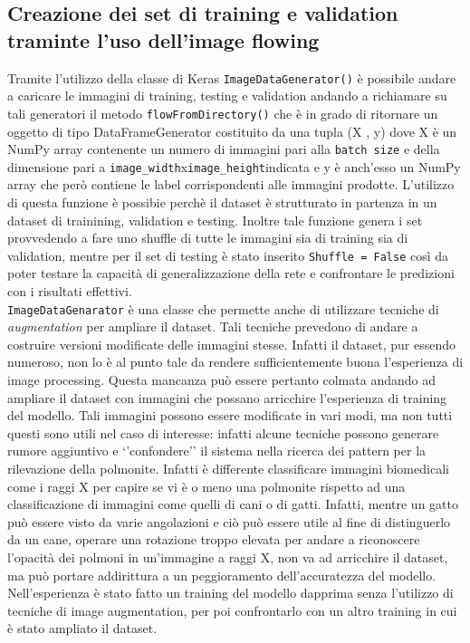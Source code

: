 \subsection{Creazione dei set di training e validation traminte l’uso dell’image flowing}
Tramite l’utilizzo della classe di Keras  \lstinline{ImageDataGenerator()} è possibile andare a caricare le
 immagini di training, testing e validation andando a richiamare su tali generatori il metodo  
 \lstinline{flowFromDirectory()} che è in grado di ritornare un oggetto di tipo DataFrameGenerator
 costituito da una tupla (X , y) dove X è un NumPy array contenente un numero di immagini pari alla 
   \lstinline{batch size} e della dimensione pari a  \lstinline{image_width}x\lstinline{image_height}indicata e 
   y è anch’esso
    un NumPy array che però contiene le label corrispondenti alle immagini prodotte. L’utilizzo di
     questa funzione è possibie perchè il dataset è strutturato in partenza in un dataset di trainining, 
     validation e testing. Inoltre tale funzione genera i set provvedendo a fare uno shuffle di tutte le immagini
      sia di training sia di  validation, mentre per il set di testing è stato inserito  \lstinline{Shuffle = False}
       così da poter testare la capacità di generalizzazione della rete e confrontare le predizioni con i risultati 
       effettivi. \\
 \lstinline{ImageDataGenarator} è una classe che permette anche di utilizzare tecniche di \emph{augmentation}
  per ampliare il dataset. Tali tecniche prevedono di andare a costruire versioni modificate delle immagini stesse. 
  Infatti il dataset, pur essendo numeroso, non lo è al punto tale da rendere sufficientemente buona l’esperienza
   di image processing. Questa mancanza può essere pertanto colmata andando ad ampliare il dataset con immagini
    che possano arricchire l’esperienza di training del modello. Tali immagini possono essere modificate in vari
     modi, ma non tutti questi sono utili nel caso di interesse: infatti alcune tecniche possono generare rumore 
     aggiuntivo e ‘’confondere’’ il sistema nella ricerca dei pattern per la rilevazione della polmonite.
     Infatti è differente classificare immagini biomedicali come i raggi
     X per capire se vi è o meno una polmonite rispetto ad una classificazione di immagini come quelli di 
     cani o di gatti. Infatti, mentre un gatto può essere visto da varie angolazioni e ciò può essere
      utile al fine di distinguerlo da un cane, operare una rotazione troppo elevata per andare a riconoscere 
      l’opacità dei polmoni in un’immagine a raggi X, non va ad arricchire il dataset, ma può portare
       addirittura a un peggioramento dell’accuratezza del modello. Nell’esperienza è stato fatto un
        training del modello dapprima senza l’utilizzo di tecniche di image augmentation, per poi confrontarlo
         con un altro training in cui è stato ampliato il dataset. \\


